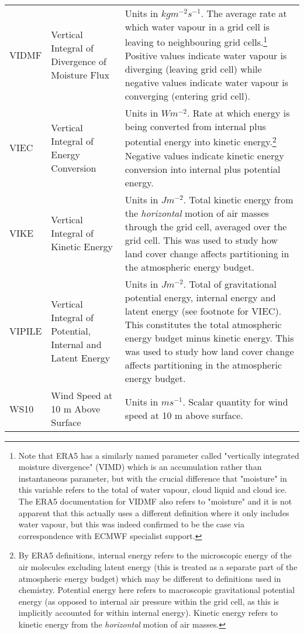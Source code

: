\begin{landscape}
\begin{longtable}{P{2cm}P{3cm}P{15cm}}
		VIDMF & Vertical Integral of Divergence of Moisture Flux & Units in $kg m^{-2} s^{-1}$. The average rate at which water vapour in a grid cell is leaving to neighbouring grid cells.\footnote{Note that ERA5 has a similarly named parameter called "vertically integrated moisture divergence" (VIMD) which is an accumulation rather than instantaneous parameter, but with the crucial difference that "moisture" in this variable refers to the total of water vapour, cloud liquid and cloud ice. The ERA5 documentation for VIDMF also refers to "moisture" and it is not apparent that this actually uses a different definition where it only includes water vapour, but this was indeed confirmed to be the case via correspondence with ECMWF specialist support.} Positive values indicate water vapour is diverging (leaving grid cell) while negative values indicate water vapour is converging (entering grid cell). \\
		VIEC & Vertical Integral of Energy Conversion & Units in $W m^{-2}$. Rate at which energy is being converted from internal plus potential energy into kinetic energy.\footnote{By ERA5 definitions, internal energy refers to the microscopic energy of the air molecules excluding latent energy (this is treated as a separate part of the atmospheric energy budget) which may be different to definitions used in chemistry. Potential energy here refers to macroscopic gravitational potential energy (as opposed to internal air pressure within the grid cell, as this is implicitly accounted for within internal energy). Kinetic energy refers to kinetic energy from the \textit{horizontal} motion of air masses.} Negative values indicate kinetic energy conversion into internal plus potential energy. \\
		VIKE & Vertical Integral of Kinetic Energy & Units in $J m^{-2}$. Total kinetic energy from the \textit{horizontal} motion of air masses through the grid cell, averaged over the grid cell. This was used to study how land cover change affects partitioning in the atmospheric energy budget. \\
		VIPILE & Vertical Integral of Potential, Internal and Latent Energy & Units in $J m^{-2}$. Total of gravitational potential energy, internal energy and latent energy (see footnote for VIEC). This constitutes the total atmospheric energy budget minus kinetic energy. This was used to study how land cover change affects partitioning in the atmospheric energy budget. \\
		WS10 & Wind Speed at 10 m Above Surface & Units in $m s^{-1}$. Scalar quantity for wind speed at 10 m above surface. \\

\end{longtable}
\end{landscape}
